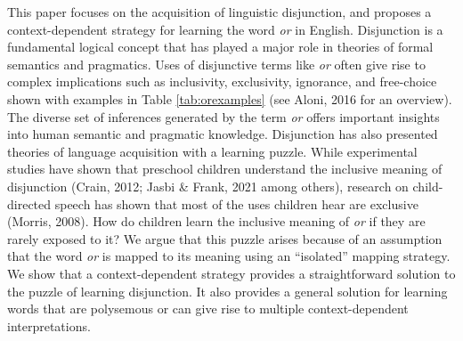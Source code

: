 \documentclass[
  ,man,floatsintext]{apa6}
\begin{document}
This paper focuses on the acquisition of linguistic disjunction, and proposes a context-dependent strategy for learning the word \emph{or} in English. Disjunction is a fundamental logical concept that has played a major role in theories of formal semantics and pragmatics. Uses of disjunctive terms like \emph{or} often give rise to complex implications such as inclusivity, exclusivity, ignorance, and free-choice shown with examples in Table \ref{tab:orexamples} (see Aloni, 2016 for an overview). The diverse set of inferences generated by the term \emph{or} offers important insights into human semantic and pragmatic knowledge. Disjunction has also presented theories of language acquisition with a learning puzzle. While experimental studies have shown that preschool children understand the inclusive meaning of disjunction (Crain, 2012; Jasbi \& Frank, 2021 among others), research on child-directed speech has shown that most of the uses children hear are exclusive (Morris, 2008). How do children learn the inclusive meaning of \emph{or} if they are rarely exposed to it? We argue that this puzzle arises because of an assumption that the word \emph{or} is mapped to its meaning using an ``isolated'' mapping strategy. We show that a context-dependent strategy provides a straightforward solution to the puzzle of learning disjunction. It also provides a general solution for learning words that are polysemous or can give rise to multiple context-dependent interpretations.
\end{document}
